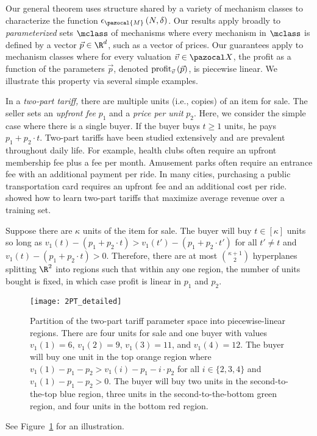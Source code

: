 Our general theorem uses structure shared by a variety of mechanism classes to characterize the function $\epsilon_{\pazocal{M}}\left(N, \delta\right)$.
Our results apply broadly to \emph{parameterized} sets $\mclass$ of mechanisms where every mechanism in $\mclass$ is defined by a vector $\vec{p}\in \R^d$, such as a vector of prices. Our guarantees apply to mechanism classes where for every valuation  $\vec{v} \in \domain$, the profit as a function of the parameters $\vec{p}$, denoted $\textnormal{profit}_{\vec{v}}\left(\vec{p}\right)$, is piecewise linear. We illustrate this property via several simple examples.

\begin{example}\label{ex:2PT}
In a \emph{two-part tariff,} there are multiple units (i.e., copies) of an item for sale. The seller sets an \emph{upfront fee} $p_1$ and a \emph{price per unit} $p_2$. Here, we consider the simple case where there is a single buyer. If the buyer buys $t \geq 1$ units, he pays $p_1 + p_2\cdot t$. Two-part tariffs have been studied extensively \citep{Oi71:Disneyland, Feldstein72:Equity, Wilson93:Nonlinear} and are prevalent throughout daily life. For example, health clubs often require an upfront membership fee plus a fee per month. Amusement parks often require an entrance fee with an additional payment per ride.
In many cities, purchasing a public transportation card requires an upfront fee and an additional cost per ride.  \citet{Balcan20:Efficient} showed how to learn two-part tariffs that maximize average revenue over a training set.

Suppose there are $\kappa$ units of the item for sale. The buyer will buy  $t \in [\kappa]$ units so long as $v_1\left(t\right) - \left(p_1 + p_2 \cdot t\right) >  v_1\left(t'\right) - \left(p_1 + p_2 \cdot t'\right)$ for all $t' \not= t$ and $v_1\left(t\right) - \left(p_1 + p_2 \cdot t\right) > 0$. Therefore, there are at most ${\kappa + 1 \choose 2}$ hyperplanes splitting $\R^2$ into regions such that within any one region, the number of units bought is fixed, in which case profit is linear in $p_1$ and $p_2$.
\begin{figure}
	\texttt{[image: 2PT\_detailed]}\centering
	\caption{Partition of the two-part tariff parameter space into piecewise-linear regions. There are four units for sale and one buyer with values $v_1(1) = 6$, $v_1(2) = 9$,  $v_1(3) = 11$, and $v_1(4) = 12$. The buyer will buy one unit in the top orange region where $v_1(1) - p_1 - p_2 > v_1(i) - p_1 - i \cdot p_2$ for all $i \in \{2, 3, 4\}$ and $v_1(1) - p_1 - p_2 > 0$. The buyer will buy two units in the second-to-the-top blue region, three units in the second-to-the-bottom green region, and four units in the bottom red region.
	}
	\label{fig:2PT_detailed}
\end{figure}
See Figure~\ref{fig:2PT_detailed} for an illustration.
\end{example}

